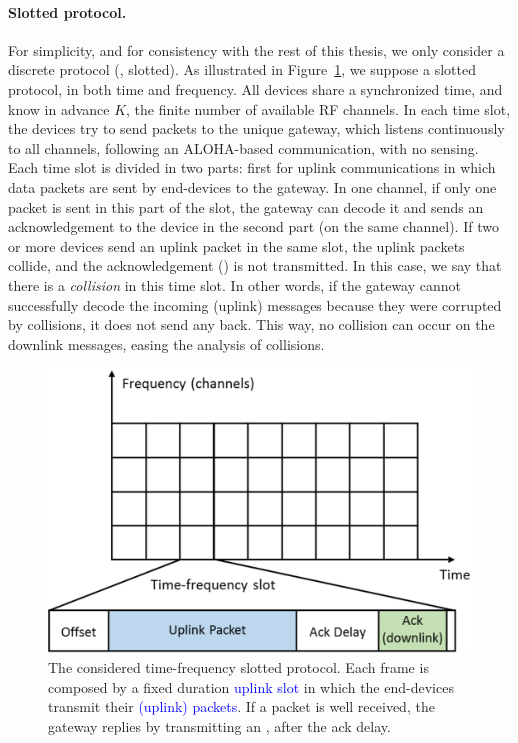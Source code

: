 \paragraph{Slotted protocol.}
%
For simplicity, and for consistency with the rest of this thesis, we only consider a discrete protocol (\ie, slotted).
As illustrated in Figure~\ref{fig:41:protocol}, we suppose a slotted protocol, in both time and frequency.
All devices share a synchronized time, and know in advance $K$, the finite number of available RF channels.
In each time slot, the devices try to send packets to the unique gateway, which listens continuously to all channels, following an ALOHA-based communication, with no sensing.
Each time slot is divided in two parts: first for uplink communications in which data packets are sent by end-devices to the gateway.
In one channel, if only one packet is sent in this part of the slot, the gateway can decode it and sends an acknowledgement to the device in the second part (on the same channel).
If two or more devices send an uplink packet in the same slot, the uplink packets collide, and the acknowledgement (\Ack) is not transmitted. In this case, we say that there is a \emph{collision} in this time slot.
In other words, if the gateway cannot successfully decode the incoming (uplink) messages because they were corrupted by collisions, it does not send any \Ack{} back.
This way, no collision can occur on the downlink messages, easing the analysis of collisions.

\begin{figure}[!h]
    \centering
    \includegraphics[scale=0.40]{protocol.eps}
    \caption[The considered time-frequency slotted protocol. Each frame is composed by a fixed duration uplink slot in which the end-devices transmit their (uplink) packets. If a packet is well received, the gateway replies by transmitting an \Ack, after the ack delay.]{The considered time-frequency slotted protocol. Each frame is composed by a fixed duration \textcolor{blue}{uplink slot} in which the end-devices transmit their \textcolor{blue}{(uplink) packets}. If a packet is well received, the gateway replies by transmitting an \textcolor{darkgreen}{\Ack}, after the ack delay.}
    \label{fig:41:protocol}
\end{figure}


